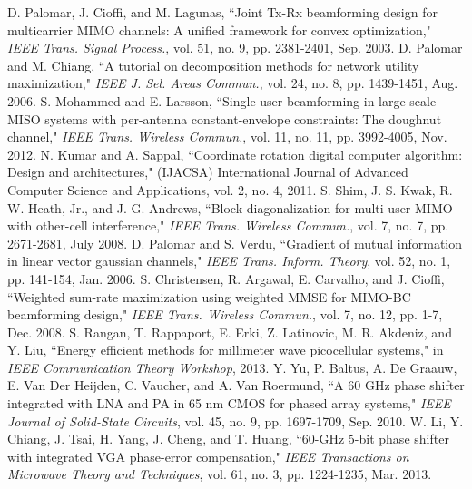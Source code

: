 \documentclass[11pt,draftcls,onecolumn]{IEEEtran}
\begin{document}
\begin{small}
\begin{thebibliography}{30}
D. Palomar, J. Cioffi, and M. Lagunas, ``Joint Tx-Rx beamforming design for multicarrier MIMO channels: A unified framework for convex optimization," \emph{IEEE Trans. Signal Process.}, vol. 51, no. 9, pp. 2381-2401, Sep. 2003.
D. Palomar and M. Chiang, ``A tutorial on decomposition methods for network utility maximization," \emph{IEEE J. Sel. Areas Commun.}, vol. 24, no. 8, pp. 1439-1451, Aug. 2006.
S. Mohammed and E. Larsson, ``Single-user beamforming in large-scale MISO systems with per-antenna constant-envelope constraints: The doughnut channel," \emph{IEEE Trans. Wireless Commun.}, vol. 11, no. 11, pp. 3992-4005, Nov. 2012.
N. Kumar and A. Sappal, ``Coordinate rotation digital computer algorithm: Design and architectures," (IJACSA) International Journal of Advanced Computer Science and Applications, vol. 2, no. 4, 2011.
S. Shim, J. S. Kwak, R. W. Heath, Jr., and J. G. Andrews, ``Block diagonalization for multi-user MIMO with other-cell interference," \emph{IEEE Trans. Wireless Commun.}, vol. 7, no. 7, pp. 2671-2681, July 2008.
D. Palomar and S. Verdu, ``Gradient of mutual information in linear vector gaussian channels," \emph{IEEE Trans. Inform. Theory}, vol. 52, no. 1, pp. 141-154, Jan. 2006.
S. Christensen, R. Argawal, E. Carvalho, and J. Cioffi, ``Weighted sum-rate maximization using weighted MMSE for MIMO-BC beamforming design," \emph{IEEE Trans. Wireless Commun.}, vol. 7, no. 12, pp. 1-7, Dec. 2008.
S. Rangan, T. Rappaport, E. Erki, Z. Latinovic, M. R. Akdeniz, and Y. Liu, ``Energy efficient methods for millimeter wave picocellular systems," in \emph{IEEE Communication Theory Workshop}, 2013.
Y. Yu, P. Baltus, A. De Graauw, E. Van Der Heijden, C. Vaucher, and A. Van Roermund, ``A 60 GHz phase shifter integrated with LNA and PA in 65 nm CMOS for phased array systems," \emph{IEEE Journal of Solid-State Circuits}, vol. 45, no. 9, pp. 1697-1709, Sep. 2010.
W. Li, Y. Chiang, J. Tsai, H. Yang, J. Cheng, and T. Huang, ``60-GHz 5-bit phase shifter with integrated VGA phase-error compensation," \emph{IEEE Transactions on Microwave Theory and Techniques}, vol. 61, no. 3, pp. 1224-1235, Mar. 2013.



\end{thebibliography}
\end{small}
\end{document}
